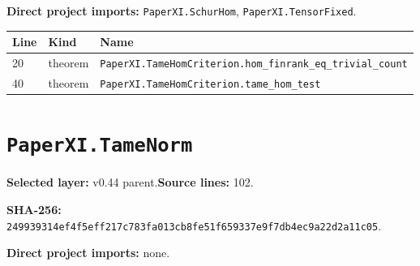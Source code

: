 \documentclass[10pt,oneside]{book}
\begin{document}
\textbf{Direct project imports:} \nolinkurl{PaperXI.SchurHom}, \nolinkurl{PaperXI.TensorFixed}.

\begin{longtable}{@{}p{}p{}p{}@{}}\toprule Line&Kind&Name\\\midrule\endhead

20&theorem&\nolinkurl{PaperXI.TameHomCriterion.hom_finrank_eq_trivial_count}\\

40&theorem&\nolinkurl{PaperXI.TameHomCriterion.tame_hom_test}\\

\bottomrule\end{longtable}

\section{\texorpdfstring{\nolinkurl{PaperXI.TameNorm}}{PaperXI.TameNorm}}\label{module:PaperXI.TameNorm}

\textbf{Selected layer:} v0.44 parent.\quad\textbf{Source lines:} 102.\par\textbf{SHA-256:} {\scriptsize\nolinkurl{249939314ef4f5eff217c783fa013cb8fe51f659337e9f7db4ec9a22d2a11c05}}.


\textbf{Direct project imports:} none.
\end{document}
